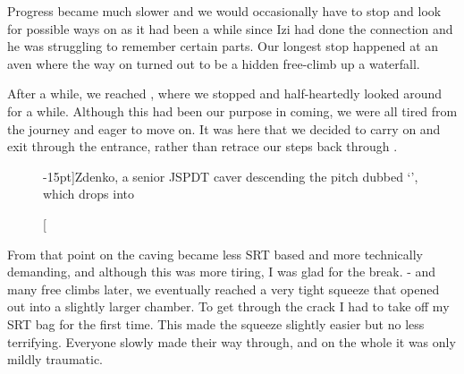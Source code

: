 Progress became much slower and we would occasionally have to stop and look for possible ways on as it had been a while since Izi had done the connection and he was struggling to remember certain parts. Our longest stop happened at an aven where the way on turned out to be a hidden free-climb up a waterfall.

After a while, we reached , where we stopped and half-heartedly looked around for a while. Although this had been our purpose in coming, we were all tired from the journey and eager to move on. It was here that we decided to carry on and exit through the  entrance, rather than retrace our steps back through . 

\begin{figure}[t!]
\checkoddpage \ifoddpage \forcerectofloat \else \forceversofloat \fi
\centering
{}
\caption[][-15pt]{Zdenko, a senior JSPDT caver descending the pitch dubbed `\protect{}', which drops into \protect{} }
\label{Zdenko16}
\end{figure}
From that point on the caving became less SRT based and more technically demanding, and although this was more tiring, I was glad for the break. - and many free climbs later, we eventually reached a very tight squeeze that opened out into a slightly larger chamber. To get through the crack I had to take off my SRT bag for the first time. This made the squeeze slightly easier but no less terrifying. Everyone slowly made their way through, and on the whole it was only mildly traumatic.

